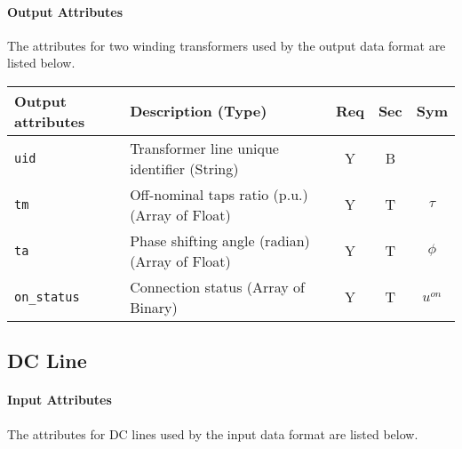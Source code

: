 \documentclass{article}
\begin{document}
\paragraph{Output Attributes}
The attributes for two winding transformers used by the output data format are listed below.
\begin{center}
\small
\begin{tabular}{ l | l | c | c | c |}
Output attributes & Description (Type)& Req & Sec & Sym\\
\hline
 {\tt uid} & Transformer line unique identifier (String)& Y & B & \\
 {\tt tm} & Off-nominal taps ratio (p.u.) (Array of Float)& Y & T & $\tau$\\
 {\tt ta} & Phase shifting angle (radian) (Array of Float)& Y & T & $\phi$\\
 {\tt on\_status}     & Connection status (Array of Binary) & Y & T & $u^{on}$ \\
\hline
\end{tabular}
\end{center}





\subsection{DC Line}
\label{nom:dcline}

\paragraph{Input Attributes}
The attributes for DC lines
used by the input data format are listed below.
\end{document}
